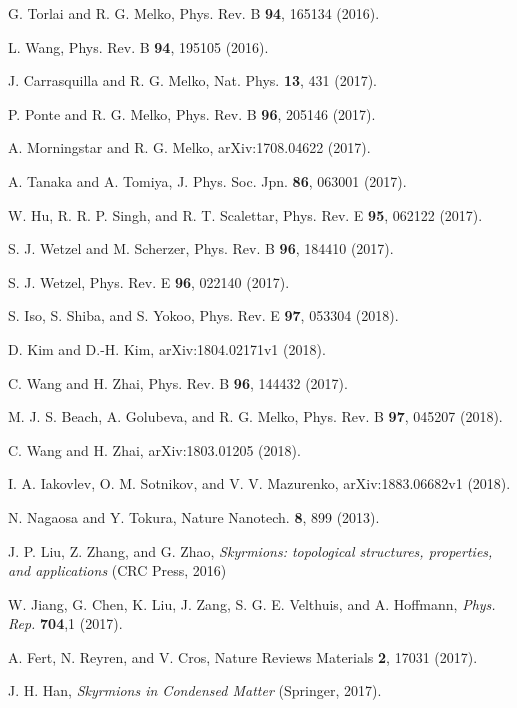 \documentclass[reprint,amsmath,amssymb,aps,showpacs,superscriptaddress,prl]{revtex4-1}
\begin{document}
\begin{thebibliography}{99}

 G. Torlai and R. G. Melko, Phys. Rev. B {\bf 94}, 165134 (2016).

 L. Wang, Phys. Rev. B {\bf 94}, 195105 (2016).

 J. Carrasquilla and R. G. Melko, Nat. Phys. {\bf 13}, 431 (2017).

 P. Ponte and R. G. Melko, Phys. Rev. B {\bf 96}, 205146 (2017).

 A. Morningstar and R. G. Melko, arXiv:1708.04622 (2017).

 A. Tanaka and A. Tomiya, J. Phys. Soc. Jpn. {\bf 86}, 063001 (2017).

 W. Hu, R. R. P. Singh, and R. T. Scalettar, Phys. Rev. E {\bf 95}, 062122 (2017).

 S. J. Wetzel and M. Scherzer, Phys. Rev. B {\bf 96}, 184410 (2017).

 S. J. Wetzel, Phys. Rev. E {\bf 96}, 022140 (2017).

 S. Iso, S. Shiba, and S. Yokoo, Phys. Rev. E {\bf 97}, 053304 (2018).

 D. Kim and D.-H. Kim, arXiv:1804.02171v1 (2018).

 C. Wang and H. Zhai, Phys. Rev. B {\bf 96}, 144432 (2017).

 M. J. S. Beach, A. Golubeva, and R. G. Melko, Phys. Rev. B {\bf 97}, 045207 (2018).

 C. Wang and H. Zhai, arXiv:1803.01205 (2018).

 I. A. Iakovlev, O. M. Sotnikov, and V. V. Mazurenko, arXiv:1883.06682v1 (2018).

 N. Nagaosa and Y. Tokura, Nature Nanotech. {\bf 8}, 899 (2013).

 J. P. Liu, Z. Zhang, and G. Zhao, {\it Skyrmions: topological structures, properties, and applications} (CRC Press, 2016)

 W. Jiang, G. Chen, K. Liu, J. Zang, S. G. E. Velthuis, and A. Hoffmann, {\it Phys. Rep.} {\bf 704},1 (2017).

 A. Fert, N. Reyren, and V. Cros, Nature Reviews Materials {\bf 2}, 17031 (2017).

 J. H. Han, {\it Skyrmions in Condensed Matter}  (Springer, 2017).


\end{thebibliography}
\end{document}
